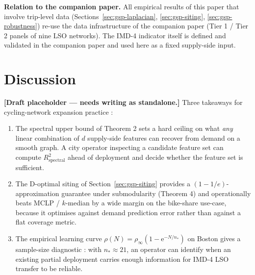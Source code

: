 \documentclass[11pt,a4paper]{article}
\begin{document}
\textbf{Relation to the companion paper.}  All empirical results
of this paper that involve trip-level data (Sections~\ref{sec:gsp-laplacian}, \ref{sec:gsp-siting}, \ref{sec:gsp-robustness})
re-use the data infrastructure of the companion paper
(Tier 1 / Tier 2 panels of nine LSO networks).  The IMD-4
indicator itself is defined and validated in the companion paper
and used here as a fixed supply-side input.




\section{Discussion}
\label{sec:discussion}

\textbf{[Draft placeholder — needs writing as standalone.]}
Three takeaways for cycling-network expansion practice :

\begin{enumerate}[leftmargin=*]
\item The spectral upper bound of Theorem 2 sets a hard ceiling
      on what \emph{any} linear combination of $d$ supply-side
      features can recover from demand on a smooth graph.  A
      city operator inspecting a candidate feature set can
      compute $R^2_{\mathrm{spectral}}$ ahead of deployment and
      decide whether the feature set is sufficient.
\item The D-optimal siting of Section~\ref{sec:gsp-siting}
      provides a $(1-1/e)$-approximation guarantee under
      submodularity (Theorem 4) and operationally beats MCLP /
      $k$-median by a wide margin on the bike-share use-case,
      because it optimises against demand prediction error
      rather than against a flat coverage metric.
\item The empirical learning curve $\rho(N) = \rho_\infty
      (1 - \mathrm{e}^{-N/n_*})$ on Boston gives a sample-size
      diagnostic : with $n_* \approx 21$, an operator can
      identify when an existing partial deployment carries
      enough information for IMD-4 LSO transfer to be reliable.
\end{enumerate}

\end{document}
